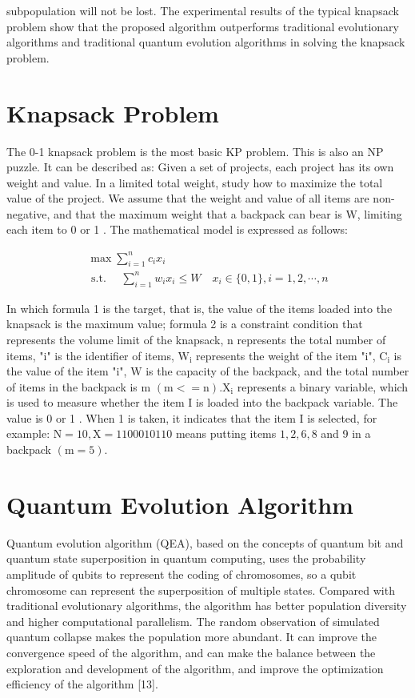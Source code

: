 \documentclass[10pt]{article}
\begin{document}
subpopulation will not be lost. The experimental results of the typical knapsack problem show that the proposed algorithm outperforms traditional evolutionary algorithms and traditional quantum evolution algorithms in solving the knapsack problem.

\section{Knapsack Problem}
The 0-1 knapsack problem is the most basic KP problem. This is also an NP puzzle. It can be described as: Given a set of projects, each project has its own weight and value. In a limited total weight, study how to maximize the total value of the project. We assume that the weight and value of all items are non-negative, and that the maximum weight that a backpack can bear is $\mathrm{W}$, limiting each item to 0 or 1 . The mathematical model is expressed as follows:

$$
\begin{gathered}
\max \sum_{i=1}^{n} c_{i} x_{i} \\
\text { s.t. } \quad \sum_{i=1}^{n} w_{i} x_{i} \leq W \quad x_{i} \in\{0,1\}, i=1,2, \cdots, n
\end{gathered}
$$

In which formula 1 is the target, that is, the value of the items loaded into the knapsack is the maximum value; formula 2 is a constraint condition that represents the volume limit of the knapsack, n represents the total number of items, "i" is the identifier of items, $\mathrm{W}_{\mathrm{i}}$ represents the weight of the item "i", $\mathrm{C}_{\mathrm{i}}$ is the value of the item "i", $\mathrm{W}$ is the capacity of the backpack, and the total number of items in the backpack is $\mathrm{m}$ $(\mathrm{m}<=\mathrm{n}) . \mathrm{X}_{\mathrm{i}}$ represents a binary variable, which is used to measure whether the item I is loaded into the backpack variable. The value is 0 or 1 . When 1 is taken, it indicates that the item I is selected, for example: $\mathrm{N}=10, \mathrm{X}=1100010110$ means putting items $1,2,6,8$ and 9 in a backpack $(\mathrm{m}=5)$.

\section{Quantum Evolution Algorithm}
Quantum evolution algorithm (QEA), based on the concepts of quantum bit and quantum state superposition in quantum computing, uses the probability amplitude of qubits to represent the coding of chromosomes, so a qubit chromosome can represent the superposition of multiple states. Compared with traditional evolutionary algorithms, the algorithm has better population diversity and higher computational parallelism. The random observation of simulated quantum collapse makes the population more abundant. It can improve the convergence speed of the algorithm, and can make the balance between the exploration and development of the algorithm, and improve the optimization efficiency of the algorithm [13].
\end{document}
